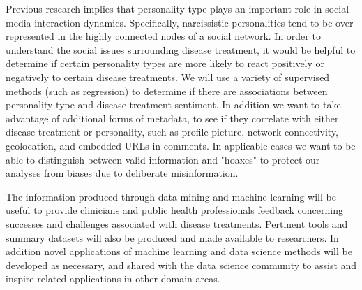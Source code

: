 
Previous research implies that personality type plays an important role in social media interaction dynamics. Specifically, narcissistic personalities tend to be over represented in the highly connected nodes of a social network. In order to understand the social issues surrounding disease treatment, it would be helpful to determine if certain personality types are more likely to react positively or negatively to certain disease treatments. We will use a variety of supervised methods (such as regression) to determine if there are associations between personality type and disease treatment sentiment. In addition we want to take advantage of additional forms of metadata, to see if they correlate with either disease treatment or personality, such as profile picture, network connectivity, geolocation, and embedded URLs in comments. In applicable cases we want to be able to distinguish between valid information and "hoaxes" to protect our analyses from biases due to deliberate misinformation.

The information produced through data mining and machine learning will be useful to provide clinicians and public health professionals feedback concerning successes and challenges associated with disease treatments. Pertinent tools and summary datasets will also be produced and made available to researchers. In addition novel applications of machine learning and data science methods will be developed as necessary, and shared with the data science community to assist and inspire related applications in other domain areas.